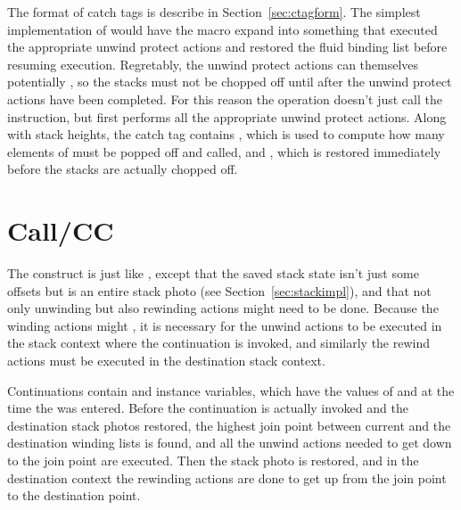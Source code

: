 The format of catch tags is describe in Section~\ref{sec:ctagform}.
The simplest implementation of  would have the
 macro expand into something that executed the
appropriate unwind protect actions and restored the fluid binding list
before resuming execution.  Regretably, the unwind protect actions can
themselves potentially , so the stacks must not be chopped
off until after the unwind protect actions have been completed.  For
this reason the  operation doesn't just call the 
instruction, but first performs all the appropriate unwind protect
actions.  Along with stack heights, the catch tag contains
, which is used to compute how many elements of
 must be popped off and called, and
, which is restored immediately before
the stacks are actually chopped off.


\section{Call/CC}

The  construct is just like , except that
the saved stack state isn't just some offsets but is an entire stack
photo (see Section~\ref{sec:stackimpl}), and that not only unwinding
but also rewinding actions might need to be done.  Because the winding
actions might , it is necessary for the unwind actions to be
executed in the stack context where the continuation is invoked, and
similarly the rewind actions must be executed in the destination stack
context.


Continuations contain  and 
instance variables, which have the values of  and
 at the time the  was entered.  Before
the continuation is actually invoked and the destination stack photos
restored, the highest join point between current and the destination
winding lists is found, and all the unwind actions needed to get down
to the join point are executed.  Then the stack photo is restored, and
in the destination context the rewinding actions are done to get up
from the join point to the destination point.


